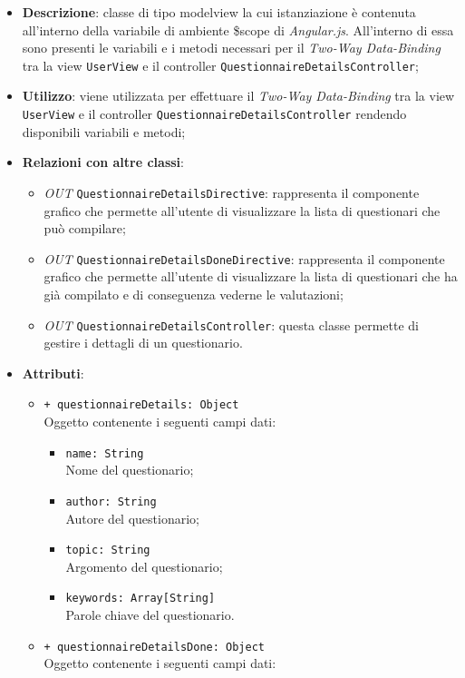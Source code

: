 	\begin{itemize}
		\item \textbf{Descrizione}: classe di tipo modelview la cui istanziazione è contenuta all'interno della variabile di ambiente \$scope di \textit{Angular.js}. All'interno di essa sono presenti le variabili e i metodi necessari per il \textit{Two-Way Data-Binding} tra la view \texttt{UserView} e il controller \texttt{QuestionnaireDetailsController};
		\item \textbf{Utilizzo}: viene utilizzata per effettuare il \textit{Two-Way Data-Binding} tra la view \texttt{UserView} e il controller \texttt{QuestionnaireDetailsController} rendendo disponibili variabili e metodi;
		\item \textbf{Relazioni con altre classi}: 
		\begin{itemize}
			\item \textit{OUT} \texttt{QuestionnaireDetailsDirective}: rappresenta il componente grafico che permette all'utente di visualizzare la lista di questionari che può compilare;
			\item \textit{OUT} \texttt{QuestionnaireDetailsDoneDirective}: rappresenta il componente grafico che permette all'utente di visualizzare la lista di questionari che ha già compilato e di conseguenza vederne le valutazioni;
			\item \textit{OUT} \texttt{QuestionnaireDetailsController}: questa classe permette di gestire i dettagli di un questionario.
		\end{itemize}
		\item \textbf{Attributi}: 
		\begin{itemize}
			\item \texttt{+ questionnaireDetails: Object} \\ Oggetto contenente i seguenti campi dati:
			\begin{itemize}
				\item \texttt{name: String}\\ Nome del questionario;
				\item \texttt{author: String}\\ Autore del questionario;
				\item \texttt{topic: String}\\ Argomento del questionario;
				\item \texttt{keywords: Array[String]}\\ Parole chiave del questionario.
			\end{itemize}
			\item \texttt{+ questionnaireDetailsDone: Object} \\ Oggetto contenente i seguenti campi dati:

\end{itemize}
\end{itemize}
